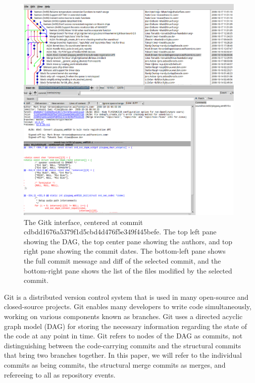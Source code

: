 \documentclass[draft]{IEEEtran}
\begin{document}
\begin{figure}
  \centering
  \includegraphics[width=0.8\linewidth]{figures/gitk.png}
  \caption{
    The Gitk interface, centered at commit
    cdbdd1676a5379f1d5cbd4d476f5e349f445befe. The top left pane showing
    the DAG, the top center pane showing the authors, and top right pane
    showing the commit dates. The bottom-left pane shows the full
    commit message and diff of the selected commit, and the bottom-right
    pane shows the list of the files modified by the selected commit.
  }
  \label{fig:gitk}
\end{figure}

Git is a distributed version control system that is used in many
open-source and closed-source projects. Git enables many developers to
write code simultaneously, working on various components known as
branches. Git uses a directed acyclic graph model (DAG) for storing the
necessary information regarding the state of the code at any point in
time. Git refers to nodes of the DAG as commits, not distinguishing
between the code-carrying commits and the structural commits that bring
two branches together. In this paper, we will refer to the individual
commits as being commits, the structural merge commits as merges, and
refereeing to all as repository events.
\end{document}

